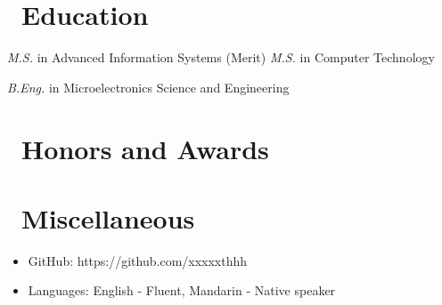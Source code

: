 \documentclass{resume}
\begin{document}
\section{\faGraduationCap\ Education}
\textit{M.S.} in Advanced Information Systems (Merit)
\textit{M.S.} in Computer Technology

\textit{B.Eng.} in Microelectronics Science and Engineering

\section{\faHeartO\ Honors and Awards}

\section{\faInfo\ Miscellaneous}
\begin{itemize}[parsep=0.5ex]
  \item GitHub: https://github.com/xxxxxthhh
  \item Languages: English - Fluent, Mandarin - Native speaker
\end{itemize}

%
%
\end{document}
